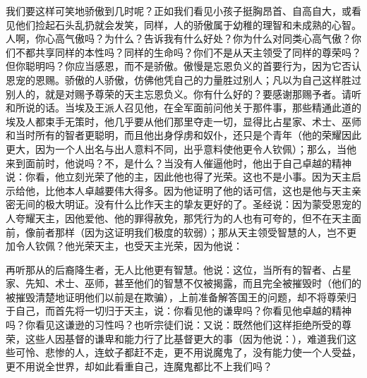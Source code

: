我们要这样可笑地骄傲到几时呢？正如我们看见小孩子挺胸昂首、自高自大，或看见他们捡起石头乱扔就会发笑，同样，人的骄傲属于幼稚的理智和未成熟的心智。人啊，你心高气傲吗？为什么？告诉我有什么好处？你为什么对同类心高气傲？你们不都共享同样的本性吗？同样的生命吗？你们不是从天主领受了同样的尊荣吗？但你聪明吗？你应当感恩，而不是骄傲。傲慢是忘恩负义的首要行为，因为它否认恩宠的恩赐。骄傲的人骄傲，仿佛他凭自己的力量胜过别人；凡以为自己这样胜过别人的，就是对赐予尊荣的天主忘恩负义。你有什么好的？要感谢那赐予者。请听和所说的话。当埃及王派人召见他，在全军面前问他关于那件事，那些精通此道的埃及人都束手无策时，他几乎要从他们那里夺走一切，显得比占星家、术士、巫师和当时所有的智者更聪明，而且他出身俘虏和奴仆，还只是个青年（他的荣耀因此更大，因为一个人出名与出人意料不同，出乎意料使他更令人钦佩）；那么，当他来到面前时，他说吗？不，是什么？当没有人催逼他时，他出于自己卓越的精神说：你看，他立刻光荣了他的主，因此他也得了光荣。这也不是小事。因为天主启示给他，比他本人卓越要伟大得多。因为他证明了他的话可信，这也是他与天主亲密无间的极大明证。没有什么比作天主的挚友更好的了。圣经说：因为蒙受恩宠的人夸耀天主，因他爱他、他的罪得赦免，那凭行为的人也有可夸的，但不在天主面前，像前者那样（因为这证明我们极度的软弱）；那从天主领受智慧的人，岂不更加令人钦佩？他光荣天主，也受天主光荣，因为他说：\par

再听那从的后裔降生者，无人比他更有智慧。他说：这位，当所有的智者、占星家、先知、术士、巫师，甚至他们的智慧不仅被揭露，而且完全被摧毁时（他们的被摧毁清楚地证明他们以前是在欺骗），上前准备解答国王的问题，却不将尊荣归于自己，而首先将一切归于天主，说：你看见他的谦卑吗？你看见他卓越的精神吗？你看见这谦逊的习性吗？也听宗徒们说：又说：既然他们这样拒绝所受的尊荣，这些人因基督的谦卑和能力行了比基督更大的事（因为他说：），难道我们这些可怜、悲惨的人，连蚊子都赶不走，更不用说魔鬼了，没有能力使一个人受益，更不用说全世界，却如此看重自己，连魔鬼都比不上我们吗？\par

